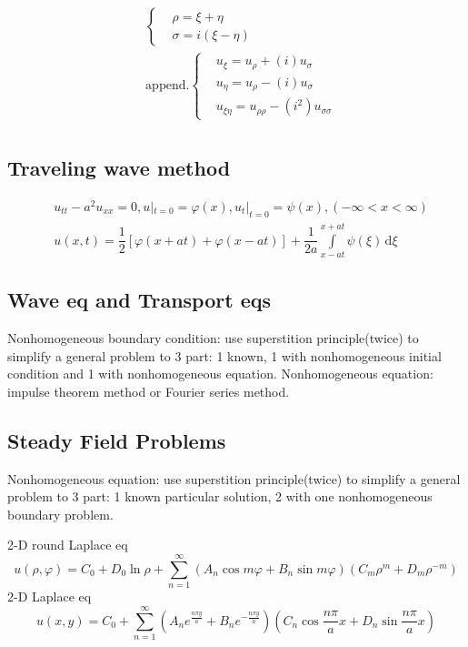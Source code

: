 \documentclass[10pt, a4paper, twocolumn]{article}
\def\d{\,\mathrm{d}}
\def\phi{\varphi}
\begin{document}
\begin{align*}
		&\left\{\begin{aligned}
			&\rho = \xi + \eta\\
			&\sigma = i(\xi - \eta)
		\end{aligned}\right.\\
		&\text{append.}\left\{\begin{aligned}
			&u_\xi = u_\rho + (i)u_\sigma\\
			&u_\eta = u_\rho - (i)u_\sigma\\
			&u_{\xi\eta} = u_{\rho\rho} -(i^2) u_{\sigma\sigma}
		\end{aligned}\right.\\
	\end{align*}

\subsection{Traveling wave method}

	\begin{align*}
		&u_{tt} - a^2u_{xx}=0, u|_{t=0} = \phi(x), u_t|_{t=0} = \psi(x), (-\infty<x<\infty)\\
		&u(x,t) = \dfrac{1}{2}[\phi(x+at)+\phi(x-at)] + \dfrac{1}{2a}
		\int\limits^{x+at}_{x-at}\psi(\xi)\d\xi
	\end{align*}

\subsection{Wave eq and Transport eqs}

	Nonhomogeneous boundary condition: use superstition principle(twice) to 
	simplify a general problem to 3 part: 1 known, 1 with nonhomogeneous initial 
	condition and 1 with nonhomogeneous equation.
	Nonhomogeneous equation: impulse theorem method or Fourier series method.

\subsection{Steady Field Problems}

	Nonhomogeneous equation: use superstition principle(twice) to 
	simplify a general problem to 3 part: 1 known particular solution, 2 with 
	one nonhomogeneous boundary problem.

	2-D round Laplace eq $$u(\rho, \phi) = C_0 + D_0\ln\rho + \sum^\infty_{n=1}
		(A_n\cos m\phi + B_n\sin m\phi)(C_m\rho^m + D_m\rho^{-m})$$
	2-D Laplace eq $$ u(x, y) = C_0 + \sum^\infty_{n=1}(A_n e^{\frac{n \pi y}{a}} + 
		B_n e^{-\frac{n \pi y}{a}})(C_n\cos\dfrac{n\pi}{a}x + D_n \sin\dfrac{n\pi}{a}x)$$
\end{document}
